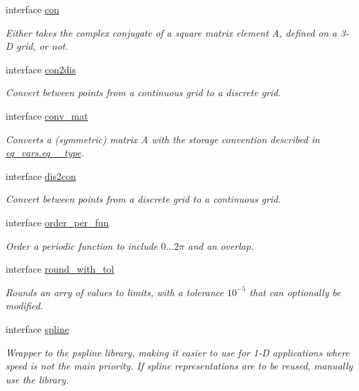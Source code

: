 \begin{DoxyCompactItemize}
interface \hyperlink{interfacenum__utilities_1_1con}{con}
\begin{DoxyCompactList}\small\item\em Either takes the complex conjugate of a square matrix element A, defined on a 3-\/D grid, or not. \end{DoxyCompactList}\item 
interface \hyperlink{interfacenum__utilities_1_1con2dis}{con2dis}
\begin{DoxyCompactList}\small\item\em Convert between points from a continuous grid to a discrete grid. \end{DoxyCompactList}\item 
interface \hyperlink{interfacenum__utilities_1_1conv__mat}{conv\+\_\+mat}
\begin{DoxyCompactList}\small\item\em Converts a (symmetric) matrix A with the storage convention described in \hyperlink{structeq__vars_1_1eq__2__type}{eq\+\_\+vars.\+eq\+\_\+\_\+type}. \end{DoxyCompactList}\item 
interface \hyperlink{interfacenum__utilities_1_1dis2con}{dis2con}
\begin{DoxyCompactList}\small\item\em Convert between points from a discrete grid to a continuous grid. \end{DoxyCompactList}\item 
interface \hyperlink{interfacenum__utilities_1_1order__per__fun}{order\+\_\+per\+\_\+fun}
\begin{DoxyCompactList}\small\item\em Order a periodic function to include $0\ldots 2\pi$ and an overlap. \end{DoxyCompactList}\item 
interface \hyperlink{interfacenum__utilities_1_1round__with__tol}{round\+\_\+with\+\_\+tol}
\begin{DoxyCompactList}\small\item\em Rounds an arry of values to limits, with a tolerance $10^{-5}$ that can optionally be modified. \end{DoxyCompactList}\item 
interface \hyperlink{interfacenum__utilities_1_1spline}{spline}
\begin{DoxyCompactList}\small\item\em Wrapper to the pspline library, making it easier to use for 1-\/D applications where speed is not the main priority. If spline representations are to be reused, manually use the library. \end{DoxyCompactList}\end{DoxyCompactItemize}
